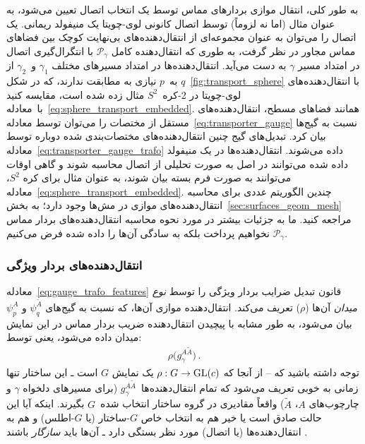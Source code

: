به طور کلی، انتقال موازی بردارهای مماس توسط یک انتخاب اتصال تعیین می‌شود، به عنوان مثال (اما نه لزوماً) توسط اتصال کانونی لوی-چویتا یک منیفولد ریمانی.
یک اتصال را می‌توان به عنوان مجموعه‌ای از انتقال‌دهنده‌های بی‌نهایت کوچک بین فضاهای مماس مجاور در نظر گرفت، به طوری که انتقال‌دهنده کامل $\mathcal{P}_\gamma$ با انتگرال‌گیری اتصال در امتداد مسیر $\gamma$ به دست می‌آید.
انتقال‌دهنده‌ها در امتداد مسیرهای مختلف $\gamma_1$ و~$\gamma_2$ از $q$ به~$p$ نیازی به مطابقت ندارند، که در شکل~\ref{fig:transport_sphere} با انتقال‌دهنده‌های لوی-چویتا در 2-کره~$S^2$ مثال زده شده است، مقایسه کنید با~معادله~\eqref{eq:sphere_transport_embedded}.
همانند فضاهای مسطح، انتقال‌دهنده‌های مستقل از مختصات را می‌توان توسط معادله~\eqref{eq:transporter_gauge} نسبت به گیج‌ها بیان کرد.
تبدیل‌های گیج چنین انتقال‌دهنده‌های مختصات‌بندی شده دوباره توسط معادله~\eqref{eq:transporter_gauge_trafo} داده می‌شوند.
انتقال‌دهنده‌ها در یک منیفولد داده شده می‌توانند در اصل به صورت تحلیلی از اتصال محاسبه شوند \cite{gallier2019diffgeom1,nakahara2003geometry} و گاهی اوقات می‌توانند به صورت فرم بسته بیان شوند، به عنوان مثال برای کره $S^2$، معادله~\eqref{eq:sphere_transport_embedded}.
چندین الگوریتم عددی برای محاسبه انتقال‌دهنده‌های موازی در مش‌ها وجود دارد؛ به بخش~\ref{sec:surfaces_geom_mesh} مراجعه کنید.
ما به جزئیات بیشتر در مورد نحوه محاسبه انتقال‌دهنده‌های بردار مماس $\mathcal{P}_\gamma$ نخواهیم پرداخت بلکه به سادگی آن‌ها را داده شده فرض می‌کنیم.


\subsubsection{انتقال‌دهنده‌های بردار ویژگی}

معادله~\eqref{eq:gauge_trafo_features} قانون تبدیل ضرایب بردار ویژگی را توسط \emph{نوع میدان} آن‌ها ($\rho$) تعریف می‌کند.
انتقال‌دهنده موازی آن‌ها، که نسبت به گیج‌های $\psi_q^{\widetilde{A}}$ و $\psi_p^A$ بیان می‌شود، به طور مشابه با پیچیدن انتقال‌دهنده ضریب بردار مماس در این نمایش میدان داده می‌شود، یعنی توسط:
\begin{align}
	\rho\big( g_\gamma^{A\widetilde{A}} \big) \,.
\end{align}
توجه داشته باشید که -- از آنجا که $\rho:G\to\operatorname{GL}(c)$ یک نمایش $G$ است ـ این ساختار تنها زمانی به خوبی تعریف می‌شود که تمام انتقال‌دهنده‌ها~$g_\gamma^{A\widetilde{A}}$ (برای مسیرهای دلخواه $\gamma$ و چارچوب‌های $A$، $\widetilde{A}$) واقعاً مقادیری در گروه ساختار انتخاب شده~$G$ بگیرند.
اینکه آیا این حالت صادق است یا خیر هم به انتخاب خاص $G$-ساختار (یا $G$-اطلس) و هم به انتقال‌دهنده‌ها (یا اتصال) مورد نظر بستگی دارد ـ آن‌ها باید \emph{سازگار} باشند \cite{wendlLectureNotesBundles2008}.


